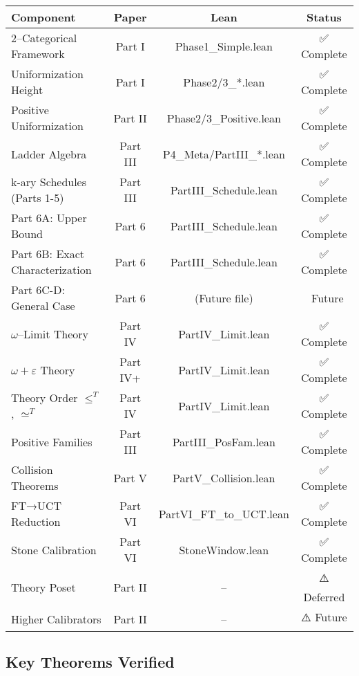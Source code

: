 \documentclass[11pt]{article}
\theoremstyle{definition}
\theoremstyle{remark}
\begin{document}
\begin{center}
\begin{tabular}{|l|c|c|c|}
\hline
\textbf{Component} & \textbf{Paper} & \textbf{Lean} & \textbf{Status} \\
\hline
2--Categorical Framework & Part I & Phase1\_Simple.lean & ✅ Complete \\
Uniformization Height & Part I & Phase2/3\_*.lean & ✅ Complete \\
Positive Uniformization & Part II & Phase2/3\_Positive.lean & ✅ Complete \\
Ladder Algebra & Part III & P4\_Meta/PartIII\_*.lean & ✅ Complete \\
k-ary Schedules (Parts 1-5) & Part III & PartIII\_Schedule.lean & ✅ Complete \\
Part 6A: Upper Bound & Part 6 & PartIII\_Schedule.lean & ✅ Complete \\
Part 6B: Exact Characterization & Part 6 & PartIII\_Schedule.lean & ✅ Complete \\
Part 6C-D: General Case & Part 6 & (Future file) & 🚧 Future \\
$\omega$--Limit Theory & Part IV & PartIV\_Limit.lean & ✅ Complete \\
$\omega+\varepsilon$ Theory & Part IV+ & PartIV\_Limit.lean & ✅ Complete \\
Theory Order $\leq^T$, $\simeq^T$ & Part IV & PartIV\_Limit.lean & ✅ Complete \\
Positive Families & Part III & PartIII\_PosFam.lean & ✅ Complete \\
Collision Theorems & Part V & PartV\_Collision.lean & ✅ Complete \\
FT→UCT Reduction & Part VI & PartVI\_FT\_to\_UCT.lean & ✅ Complete \\
Stone Calibration & Part VI & StoneWindow.lean & ✅ Complete \\
Theory Poset & Part II & -- & ⚠️ Deferred \\
Higher Calibrators & Part II & -- & ⚠️ Future \\
\hline
\end{tabular}
\end{center}

\subsection{Key Theorems Verified}
\end{document}
